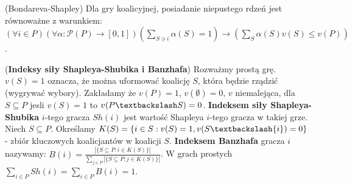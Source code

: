 \begin{twierdzenie}{(Bondareva-Shapley)}
    Dla gry koalicyjnej, posiadanie niepustego rdzeń jest równoważne z warunkiem: 
    $(\forall i\in P) (\forall \alpha:\mathcal{P}(P)\rightarrow[0,1]) \left(\sum\limits_{S\owns i}{\alpha(S)=1} \right)\rightarrow \left(\sum\limits_S{\alpha(S)v(S)\leq v(P)} \right)$.
\end{twierdzenie}
\begin{definicja}{(\textbf{Indeksy siły Shapleya-Shubika i Banzhafa})}
    Rozważmy prostą grę. $v(S)=1$ oznacza, że można uformować koalicję $S$, która będzie rządzić (wygrywać wybory). 
    Zakładamy że $v(P)=1$, $v(\emptyset)=0$, $v$ niemalejąca, dla $S\subseteq P$ jesli $v(S)=1$ to $v(P\textbackslash S)=0$.
    \textbf{Indeksem siły Shapleya-Shubika} $i$-tego gracza $Sh(i)$ jest wartość Shapleya $i$-tego gracza w takiej grze.
    Niech $S\subseteq P$. Określamy $K(S)=\{i\in S: v(S)=1, v(S\textbackslash\{i\})=0\}$ - zbiór kluczowych koalicjantów w koalicji $S$.
    \textbf{Indeksem Banzhafa} gracza $i$ nazywamy: $B(i)=\frac{|\{S\subseteq P: i\in K(S)\}|}{\sum\limits_{j\in P}|\{S\subseteq P: j\in K(S)\}|}$.
    W grach prostych $\sum\limits_{i\in P}{Sh(i)} = \sum\limits_{i\in P}{B(i)} = 1$.
\end{definicja}


